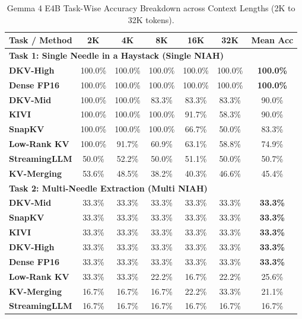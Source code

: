 \documentclass[10pt]{article}
\theoremstyle{definition}
\begin{document}
\begin{table}[h]
\vspace{6pt}
\centering
\small
\caption{Gemma 4 E4B Task-Wise Accuracy Breakdown across Context Lengths (2K to 32K tokens).}
\label{tab:e4b_task_breakdown}
\begin{tabular}{lcccccc}
\toprule
\textbf{Task / Method} & \textbf{2K} & \textbf{4K} & \textbf{8K} & \textbf{16K} & \textbf{32K} & \textbf{Mean Acc} \\
\midrule
\multicolumn{7}{l}{\textbf{Task 1: Single Needle in a Haystack (Single NIAH)}} \\
\textbf{DKV-High} & 100.0\% & 100.0\% & 100.0\% & 100.0\% & 100.0\% & \textbf{100.0\%} \\
\textbf{Dense FP16} & 100.0\% & 100.0\% & 100.0\% & 100.0\% & 100.0\% & \textbf{100.0\%} \\
\textbf{DKV-Mid} & 100.0\% & 100.0\% & 83.3\% & 83.3\% & 83.3\% & 90.0\% \\
\textbf{KIVI} & 100.0\% & 100.0\% & 100.0\% & 91.7\% & 58.3\% & 90.0\% \\
\textbf{SnapKV} & 100.0\% & 100.0\% & 100.0\% & 66.7\% & 50.0\% & 83.3\% \\
\textbf{Low-Rank KV} & 100.0\% & 91.7\% & 60.9\% & 63.1\% & 58.8\% & 74.9\% \\
\textbf{StreamingLLM} & 50.0\% & 52.2\% & 50.0\% & 51.1\% & 50.0\% & 50.7\% \\
\textbf{KV-Merging} & 53.6\% & 48.5\% & 38.2\% & 40.3\% & 46.6\% & 45.4\% \\
\midrule
\multicolumn{7}{l}{\textbf{Task 2: Multi-Needle Extraction (Multi NIAH)}} \\
\textbf{DKV-Mid} & 33.3\% & 33.3\% & 33.3\% & 33.3\% & 33.3\% & \textbf{33.3\%} \\
\textbf{SnapKV} & 33.3\% & 33.3\% & 33.3\% & 33.3\% & 33.3\% & \textbf{33.3\%} \\
\textbf{KIVI} & 33.3\% & 33.3\% & 33.3\% & 33.3\% & 33.3\% & \textbf{33.3\%} \\
\textbf{DKV-High} & 33.3\% & 33.3\% & 33.3\% & 33.3\% & 33.3\% & \textbf{33.3\%} \\
\textbf{Dense FP16} & 33.3\% & 33.3\% & 33.3\% & 33.3\% & 33.3\% & \textbf{33.3\%} \\
\textbf{Low-Rank KV} & 33.3\% & 33.3\% & 22.2\% & 16.7\% & 22.2\% & 25.6\% \\
\textbf{KV-Merging} & 16.7\% & 16.7\% & 16.7\% & 22.2\% & 33.3\% & 21.1\% \\
\textbf{StreamingLLM} & 16.7\% & 16.7\% & 16.7\% & 16.7\% & 16.7\% & 16.7\% \\

\end{tabular}
\end{table}
\end{document}
